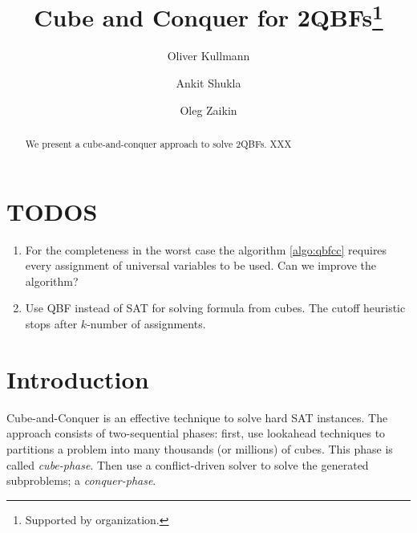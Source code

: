 \documentclass[runningheads]{llncs}
\begin{document}
%
\title{Cube and Conquer for 2QBFs\thanks{Supported by organization.}}
%
%
\author{Oliver Kullmann \and Ankit Shukla \and Oleg Zaikin}



\maketitle              %
%
\begin{abstract}
We present a cube-and-conquer approach to solve 2QBFs.
XXX 
\end{abstract}
%
%
%
\setcounter{section}{-1}
\section{TODOS}
\label{sec:todos}
\begin{enumerate}
	\item For the completeness in the worst case the algorithm \ref{algo:qbfcc} requires every assignment of universal variables to be used. Can we improve the algorithm?
	\item Use QBF instead of SAT for solving formula from cubes. The cutoff heuristic stops after $k$-number of assignments.
\end{enumerate}

\section{Introduction} \label{sec:introduction}
Cube-and-Conquer \cite{HeuleKWB11} is an effective technique to solve hard SAT instances. The approach consists of two-sequential phases: first, use lookahead techniques to partitions a problem into many thousands (or millions) of cubes. This phase is called \textit{cube-phase}.
Then use a conflict-driven solver to solve the generated subproblems; a \textit{conquer-phase}.
\end{document}
